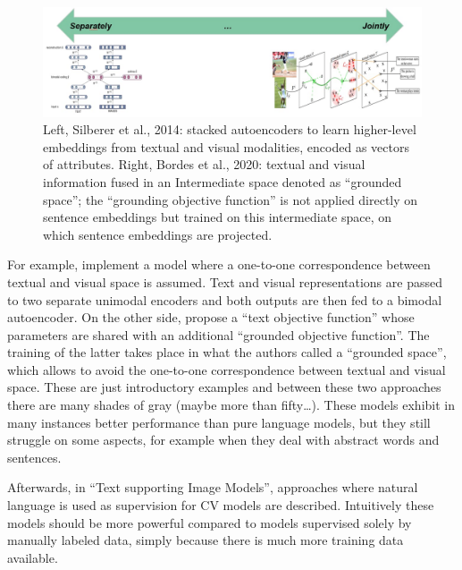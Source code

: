 \documentclass[
]{krantz}
\begin{document}
\begin{figure}

{\centering \includegraphics[width=1\linewidth]{figures/02-chapter2/Img_Ch_Intro} 

}

\caption{Left, Silberer et al., 2014: stacked autoencoders to learn higher-level embeddings from textual and visual modalities, encoded as vectors of attributes. Right, Bordes et al., 2020: textual and visual information fused in an Intermediate space denoted as “grounded space”; the “grounding objective function” is not applied directly on sentence embeddings but trained on this intermediate space, on which sentence embeddings are projected.}\label{fig:unnamed-chunk-1}
\end{figure}

For example, \citet{silberer2012grounded} implement a model where a one-to-one correspondence between textual and visual space is assumed.
Text and visual representations are passed to two separate unimodal encoders and both outputs are then fed to a bimodal autoencoder.
On the other side, \citet{bordes2020incorporating} propose a ``text objective function'' whose parameters are shared with an additional ``grounded objective function''.
The training of the latter takes place in what the authors called a ``grounded space'', which allows to avoid the one-to-one correspondence between textual and visual space.
These are just introductory examples and between these two approaches there are many shades of gray (maybe more than fifty\ldots).
These models exhibit in many instances better performance than pure language models, but they still struggle on some aspects, for example when they deal with abstract words and sentences.

Afterwards, in ``Text supporting Image Models'', approaches where natural language is used as supervision for CV models are described.
Intuitively these models should be more powerful compared to models supervised solely by manually labeled data, simply because there is much more training data available.
\end{document}
